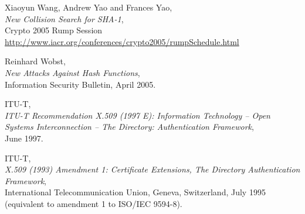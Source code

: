 \begin{thebibliography}{99999}
  Xiaoyun Wang, Andrew Yao and Frances Yao, 
     \\
    {\em New Collision Search for SHA-1}, \\
    Crypto 2005 Rump Session \\
    \url{http://www.iacr.org/conferences/crypto2005/rumpSchedule.html}

  
    Reinhard Wobst, \\
    {\em New Attacks Against Hash Functions}, \\
    Information Security Bulletin, April 2005.

 ITU-T, 
     \\
    {\em ITU-T Recommendation X.509 (1997 E): Information Technology -- 
    Open Systems Interconnection -- The Directory: Authentication Framework},\\
    June 1997.
    
 ITU-T, 
       \\
    {\em X.509 (1993) Amendment 1: Certificate Extensions, The Directory
    Authentication Framework},\\ 
    International Telecommunication Union, Geneva, Switzerland, July 1995\\
    (equivalent to amendment 1 to ISO/IEC 9594-8).

\end{thebibliography}

